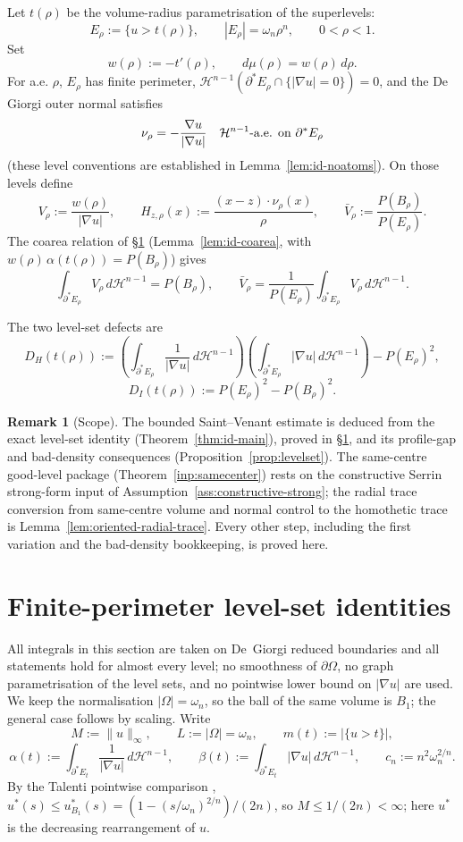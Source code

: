 \documentclass[11pt]{amsart}
\theoremstyle{definition}
\newtheorem{remark}[theorem]{Remark}
\newcommand{\Om}{\Omega}
\newcommand{\wt}{w}
\newcommand{\Hn}{\mathcal H^{n-1}}
\newcommand{\Per}{P}
\begin{document}
Let \(t(\rho)\) be the volume-radius parametrisation of the superlevels:
\[
   E_\rho:=\{u>t(\rho)\},\qquad |E_\rho|=\omega_n\rho^n,
   \qquad 0<\rho<1.
\]
Set
\[
   \wt(\rho):=-t'(\rho),\qquad d\mu(\rho)=\wt(\rho)\,d\rho.
\]
For a.e. \(\rho\), \(E_\rho\) has finite perimeter, \(\Hn(\partial^*E_\rho
\cap\{|\nabla u|=0\})=0\), and the De Giorgi outer normal satisfies
\[
   \nu_\rho=-\frac{\nabla u}{|\nabla u|}
   \quad\Hn\hbox{-a.e. on }\partial^*E_\rho
\]
(these level conventions are established in
Lemma~\ref{lem:id-noatoms}).  On those levels define
\[
   V_\rho:=\frac{\wt(\rho)}{|\nabla u|},\qquad
   H_{z,\rho}(x):=\frac{(x-z)\cdot\nu_\rho(x)}{\rho},\qquad
   \bar V_\rho:=\frac{\Per(B_\rho)}{\Per(E_\rho)}.
\]
The coarea relation of \S\ref{sec:identity}
(Lemma~\ref{lem:id-coarea}, with \(\wt(\rho)\,\alpha(t(\rho))=\Per(B_\rho)\))
gives
\begin{equation}\label{eq:V-mean}
   \int_{\partial^*E_\rho} V_\rho\,d\Hn=\Per(B_\rho),
   \qquad
   \bar V_\rho=\frac1{\Per(E_\rho)}
       \int_{\partial^*E_\rho}V_\rho\,d\Hn .
\end{equation}

The two level-set defects are
\[
   D_H(t(\rho))
   :=\left(\int_{\partial^*E_\rho}\frac1{|\nabla u|}\,d\Hn\right)
     \left(\int_{\partial^*E_\rho}|\nabla u|\,d\Hn\right)
      -\Per(E_\rho)^2,
\]
\[
   D_I(t(\rho)):=\Per(E_\rho)^2-\Per(B_\rho)^2 .
\]

\begin{remark}[Scope]\label{rem:scope}
The bounded Saint--Venant estimate is deduced from the exact level-set
identity (Theorem~\ref{thm:id-main}), proved in \S\ref{sec:identity}, and its
profile-gap and bad-density consequences (Proposition~\ref{prop:levelset}).
The same-centre good-level package (Theorem~\ref{inp:samecenter}) rests on the
constructive Serrin strong-form input of Assumption~\ref{ass:constructive-strong};
the radial trace conversion from same-centre volume and normal control to the
homothetic trace is Lemma~\ref{lem:oriented-radial-trace}.  Every other step,
including the first variation and the bad-density bookkeeping, is proved here.
\end{remark}

\section{Finite-perimeter level-set identities}\label{sec:identity}

All integrals in this section are taken on De~Giorgi reduced boundaries and all
statements hold for almost every level; no smoothness of \(\partial\Om\), no
graph parametrisation of the level sets, and no pointwise lower bound on
\(|\nabla u|\) are used.  We keep the normalisation \(|\Om|=\omega_n\), so the
ball of the same volume is \(B_1\); the general case follows by scaling.  Write
\[
   M:=\|u\|_\infty,\qquad L:=|\Om|=\omega_n,\qquad
   m(t):=|\{u>t\}|,
\]
\[
   \alpha(t):=\int_{\partial^*E_t}\frac1{|\nabla u|}\,d\Hn,\qquad
   \beta(t):=\int_{\partial^*E_t}|\nabla u|\,d\Hn,\qquad
   c_n:=n^2\omega_n^{2/n}.
\]
By the Talenti pointwise comparison \cite{Talenti1976},
\(u^*(s)\le u_{B_1}^*(s)=(1-(s/\omega_n)^{2/n})/(2n)\), so
\(M\le 1/(2n)<\infty\); here \(u^*\) is the decreasing rearrangement of \(u\).
\end{document}
